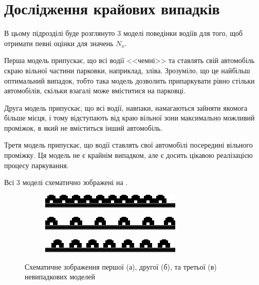 \section{Дослідження крайових випадків}

В цьому підрозділі буде розглянуто 3 моделі поведінки водіїв для того, щоб отримати певні оцінки для значень $N_{x}$.

Перша модель припускає, що всі водії <<чемні>> та ставлять свій автомобіль скраю вільної частини парковки, наприклад, зліва. Зрозуміло, що це найбільш оптимальний випадок, тобто така модель дозволить припаркувати рівно стільки автомобілів, скільки взагалі може вміститися на парковці.

Друга модель припускає, що всі водії, навпаки, намагаються зайняти якомога більше місця, і тому відступають від краю вільної зони максимально можливий проміжок, в який не вміститься інший автомобіль.

Третя модель припускає, що водії ставлять свої автомобілі посередині вільного проміжку. Ця модель не є крайнім випадком, але є досить цікавою реалізацією процесу паркування.

Всі 3 моделі схематично зображені на .

\begin{figure}[bh]
	\begin{subfigure}[b]{0.32\textwidth}    
		\centering
		\includegraphics[width=1\linewidth]{chapter_Asymptotics/img/parking_trivial1}
		\caption{}
	\end{subfigure}
	\begin{subfigure}[b]{0.32\textwidth}    
		\centering
		\includegraphics[width=1\linewidth]{chapter_Asymptotics/img/parking_trivial2}
		\caption{}
	\end{subfigure}
	\begin{subfigure}[b]{0.32\textwidth}    
		\centering
		\includegraphics[width=1\linewidth]{chapter_Asymptotics/img/parking_trivial3}
		\caption{}
	\end{subfigure}
	\caption{Схематичне зображення першої (а), другої (б), та третьої (в) невипадкових моделей}
	\label{fig:trivial_cases}
\end{figure}

